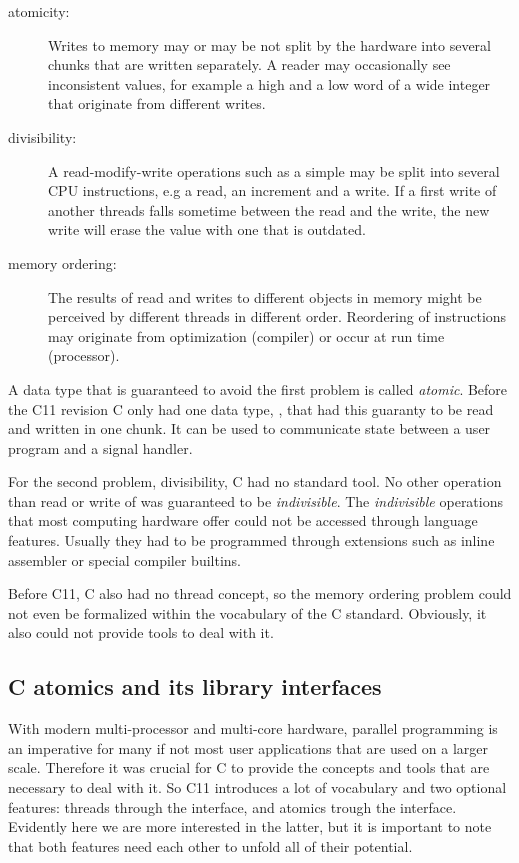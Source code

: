 \begin{description}
\item[{atomicity:}] Writes to memory may or may be not split by the
hardware into several chunks that are written
separately. A reader may occasionally see
inconsistent values, for example a high and a low
word of a wide integer that originate from different
writes.\itemadjust
\item[{divisibility:}] A read-modify-write operations such as a simple
 may be split into several CPU instructions,
e.g a read, an increment and a write. If a first
write of another threads falls sometime between
the read and the write, the new write will erase
the value with one that is outdated.\itemadjust
\item[{memory ordering:}] The results of read and writes to different
objects in memory might be perceived by different threads in
different order. Reordering of instructions may originate from
optimization (compiler) or occur at run time (processor).
\end{description}

\itemadjust
A data type that is guaranteed to avoid the first problem is called
\emph{atomic}. Before the C11 revision C only had one data type,
, that had this guaranty to be read and written in one
chunk. It can be used to communicate state between a user program
and a signal handler.

For the second problem, divisibility, C had no standard tool. No
other operation than read or write of  was guaranteed
to be \emph{indivisible}.  The \emph{indivisible} operations that most
computing hardware offer could not be accessed through language
features. Usually they had to be programmed through extensions such
as inline assembler or special compiler builtins.

Before C11, C also had no thread concept, so the memory ordering
problem could not even be formalized within the vocabulary of the C
standard. Obviously, it also could not provide tools to deal with
it.

\subsection{C atomics and its library interfaces}
\label{sec-2-1}

With modern multi-processor and multi-core hardware, parallel
programming is an imperative for many if not most user applications
that are used on a larger scale. Therefore it was crucial for C to
provide the concepts and tools that are necessary to deal with
it. So C11 introduces a lot of vocabulary and two optional
features: threads through the  interface, and atomics
trough the  interface. Evidently here we are more
interested in the latter, but it is important to note that both
features need each other to unfold all of their potential.

